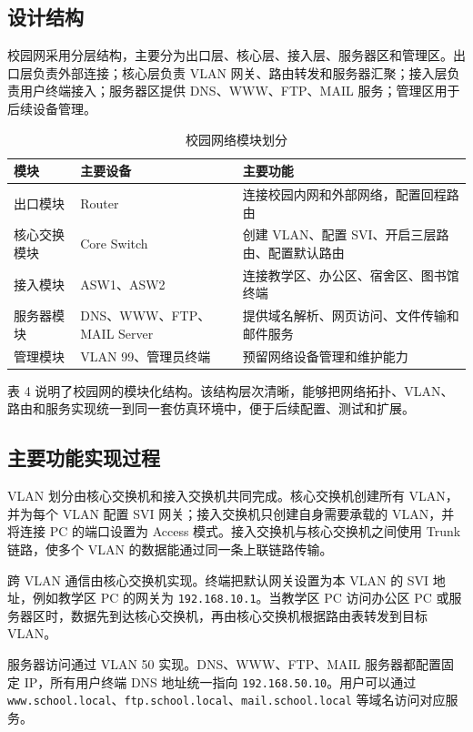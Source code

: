 \documentclass[UTF8,a4paper]{ctexart}
\begin{document}
\subsection{设计结构}

校园网采用分层结构，主要分为出口层、核心层、接入层、服务器区和管理区。出口层负责外部连接；核心层负责 VLAN 网关、路由转发和服务器汇聚；接入层负责用户终端接入；服务器区提供 DNS、WWW、FTP、MAIL 服务；管理区用于后续设备管理。

\begin{table}[H]
\centering
\caption{校园网络模块划分}
\begin{tabularx}{\textwidth}{p{2.5cm}p{3.2cm}Y}
\toprule
模块 & 主要设备 & 主要功能 \\
\midrule
出口模块 & Router & 连接校园内网和外部网络，配置回程路由 \\
核心交换模块 & Core Switch & 创建 VLAN、配置 SVI、开启三层路由、配置默认路由 \\
接入模块 & ASW1、ASW2 & 连接教学区、办公区、宿舍区、图书馆终端 \\
服务器模块 & DNS、WWW、FTP、MAIL Server & 提供域名解析、网页访问、文件传输和邮件服务 \\
管理模块 & VLAN 99、管理员终端 & 预留网络设备管理和维护能力 \\
\bottomrule
\end{tabularx}
\end{table}

表 4 说明了校园网的模块化结构。该结构层次清晰，能够把网络拓扑、VLAN、路由和服务实现统一到同一套仿真环境中，便于后续配置、测试和扩展。

\subsection{主要功能实现过程}

VLAN 划分由核心交换机和接入交换机共同完成。核心交换机创建所有 VLAN，并为每个 VLAN 配置 SVI 网关；接入交换机只创建自身需要承载的 VLAN，并将连接 PC 的端口设置为 Access 模式。接入交换机与核心交换机之间使用 Trunk 链路，使多个 VLAN 的数据能通过同一条上联链路传输。

跨 VLAN 通信由核心交换机实现。终端把默认网关设置为本 VLAN 的 SVI 地址，例如教学区 PC 的网关为 \texttt{192.168.10.1}。当教学区 PC 访问办公区 PC 或服务器区时，数据先到达核心交换机，再由核心交换机根据路由表转发到目标 VLAN。

服务器访问通过 VLAN 50 实现。DNS、WWW、FTP、MAIL 服务器都配置固定 IP，所有用户终端 DNS 地址统一指向 \texttt{192.168.50.10}。用户可以通过 \texttt{www.school.local}、\texttt{ftp.school.local}、\texttt{mail.school.local} 等域名访问对应服务。
\end{document}
